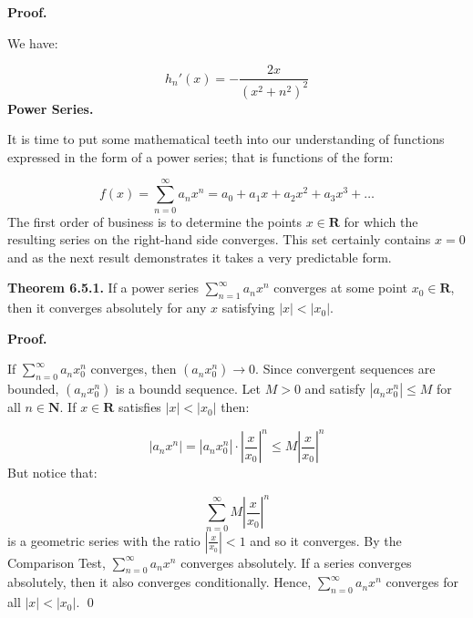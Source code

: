 \documentclass[10pt]{article}
\begin{document}
\textbf{Proof.}



We have:


\begin{equation*}
h_{n} '( x) =-\frac{2x}{\left( x^{2} +n^{2}\right)^{2}}
\end{equation*}
\textbf{Power Series.}



It is time to put some mathematical teeth into our understanding of functions expressed in the form of a power series; that is functions of the form:


\begin{equation*}
f( x) =\sum _{n=0}^{\infty } a_{n} x^{n} =a_{0} +a_{1} x+a_{2} x^{2} +a_{3} x^{3} +\dotsc 
\end{equation*}
The first order of business is to determine the points $\displaystyle x\in \mathbf{R}$ for which the resulting series on the right-hand side converges. This set certainly contains $\displaystyle x=0$ and as the next result demonstrates it takes a very predictable form. 



\textbf{Theorem 6.5.1.} If a power series $\displaystyle \sum _{n=1}^{\infty } a_{n} x^{n}$ converges at some point $\displaystyle x_{0} \in \mathbf{R}$, then it converges absolutely for any $\displaystyle x$ satisfying $\displaystyle |x|< |x_{0} |$.



\textbf{Proof.}



If $\displaystyle \sum _{n=0}^{\infty } a_{n} x_{0}^{n}$ converges, then $\displaystyle \left( a_{n} x_{0}^{n}\right)\rightarrow 0$. Since convergent sequences are bounded, $\displaystyle \left( a_{n} x_{0}^{n}\right)$ is a boundd sequence. Let $\displaystyle M >0$ and satisfy $\displaystyle |a_{n} x_{0}^{n} |\leq M$ for all $\displaystyle n\in \mathbf{N}$. If $\displaystyle x\in \mathbf{R}$ satisfies $\displaystyle |x|< |x_{0} |$ then:




\begin{equation*}
|a_{n} x^{n} |=|a_{n} x_{0}^{n} |\cdot \left| \frac{x}{x_{0}}\right| ^{n} \leq M\left| \frac{x}{x_{0}}\right| ^{n}
\end{equation*}
But notice that:




\begin{equation*}
\sum _{n=0}^{\infty } M\left| \frac{x}{x_{0}}\right| ^{n}
\end{equation*}
is a geometric series with the ratio $\displaystyle \left| \frac{x}{x_{0}}\right| < 1$ and so it converges. By the Comparison Test, $\displaystyle \sum _{n=0}^{\infty } a_{n} x^{n}$ converges absolutely. If a series converges absolutely, then it also converges conditionally. Hence, $\displaystyle \sum _{n=0}^{\infty } a_{n} x^{n}$ converges for all $\displaystyle |x|< |x_{0} |$. \qed 
\end{document}

